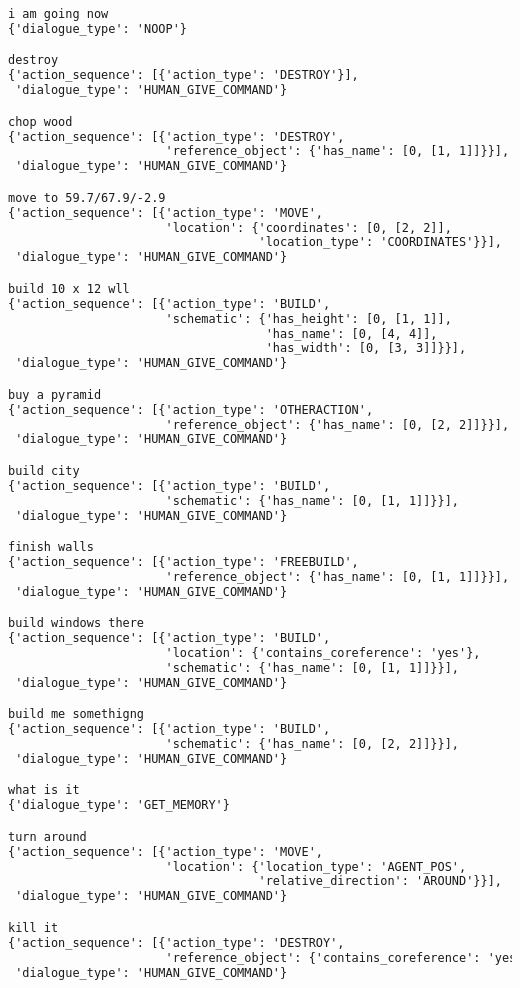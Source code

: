 \begin{lstlisting}[language=TeX]
i am going now
{'dialogue_type': 'NOOP'}

destroy
{'action_sequence': [{'action_type': 'DESTROY'}],
 'dialogue_type': 'HUMAN_GIVE_COMMAND'}

chop wood
{'action_sequence': [{'action_type': 'DESTROY',
                      'reference_object': {'has_name': [0, [1, 1]]}}],
 'dialogue_type': 'HUMAN_GIVE_COMMAND'}

move to 59.7/67.9/-2.9
{'action_sequence': [{'action_type': 'MOVE',
                      'location': {'coordinates': [0, [2, 2]],
                                   'location_type': 'COORDINATES'}}],
 'dialogue_type': 'HUMAN_GIVE_COMMAND'}

build 10 x 12 wll
{'action_sequence': [{'action_type': 'BUILD',
                      'schematic': {'has_height': [0, [1, 1]],
                                    'has_name': [0, [4, 4]],
                                    'has_width': [0, [3, 3]]}}],
 'dialogue_type': 'HUMAN_GIVE_COMMAND'}

buy a pyramid
{'action_sequence': [{'action_type': 'OTHERACTION',
                      'reference_object': {'has_name': [0, [2, 2]]}}],
 'dialogue_type': 'HUMAN_GIVE_COMMAND'}

build city
{'action_sequence': [{'action_type': 'BUILD',
                      'schematic': {'has_name': [0, [1, 1]]}}],
 'dialogue_type': 'HUMAN_GIVE_COMMAND'}

finish walls
{'action_sequence': [{'action_type': 'FREEBUILD',
                      'reference_object': {'has_name': [0, [1, 1]]}}],
 'dialogue_type': 'HUMAN_GIVE_COMMAND'}

build windows there
{'action_sequence': [{'action_type': 'BUILD',
                      'location': {'contains_coreference': 'yes'},
                      'schematic': {'has_name': [0, [1, 1]]}}],
 'dialogue_type': 'HUMAN_GIVE_COMMAND'}

build me somethigng
{'action_sequence': [{'action_type': 'BUILD',
                      'schematic': {'has_name': [0, [2, 2]]}}],
 'dialogue_type': 'HUMAN_GIVE_COMMAND'}

what is it
{'dialogue_type': 'GET_MEMORY'}

turn around
{'action_sequence': [{'action_type': 'MOVE',
                      'location': {'location_type': 'AGENT_POS',
                                   'relative_direction': 'AROUND'}}],
 'dialogue_type': 'HUMAN_GIVE_COMMAND'}

kill it
{'action_sequence': [{'action_type': 'DESTROY',
                      'reference_object': {'contains_coreference': 'yes'}}],
 'dialogue_type': 'HUMAN_GIVE_COMMAND'}


\end{lstlisting}
